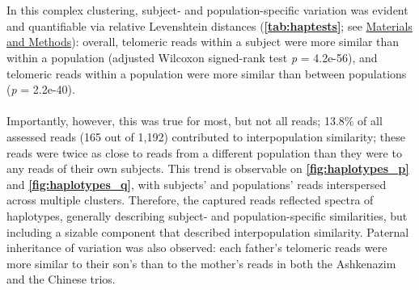 \documentclass{article}
\begin{document}
    ~\\~\\
    In this complex clustering, subject- and population-specific variation was evident and quantifiable via relative Levenshtein distances
        (\textbf{\autoref{tab:haptests}}; see \hyperref[sec:methods]{Materials and Methods}):
        overall,
            telomeric reads within a subject were more similar than within a population
                (adjusted Wilcoxon signed-rank test \textit{p} = 4.2e-56),
            and telomeric reads within a population were more similar than between populations
                (\textit{p} = 2.2e-40).
        ~\\
        
        ~\\
        Importantly, however, this was true for most, but not all reads;
            13.8\% of all assessed reads (165 out of 1,192) contributed to interpopulation similarity;
                these reads were twice as close to reads from a different population than they were to any reads of their own subjects.
            This trend is observable on \textbf{\autoref{fig:haplotypes_p}} and \textbf{\autoref{fig:haplotypes_q}},
                with subjects' and populations' reads interspersed across multiple clusters.
        Therefore, the captured reads reflected spectra of haplotypes,
            generally describing subject- and population-specific similarities,
            but including a sizable component that described interpopulation similarity.
        Paternal inheritance of variation was also observed:
            each father's telomeric reads were more similar to their son's than to the mother's reads
                in both the Ashkenazim and the Chinese trios.
\end{document}
